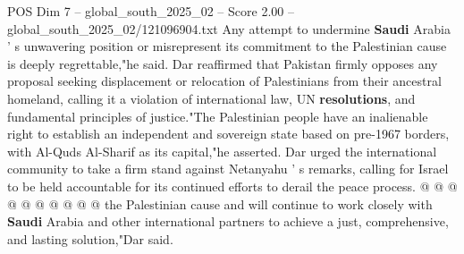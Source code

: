 \begin{textsample}{POS Dim 7 – global\_south\_2025\_02 – Score 2.00 – global\_south\_2025\_02/121096904.txt}
Any attempt to undermine \textbf{Saudi} Arabia ' s unwavering position or misrepresent its commitment to the Palestinian cause is deeply regrettable,"he said.
Dar reaffirmed that Pakistan firmly opposes any proposal seeking displacement or relocation of Palestinians from their ancestral homeland, calling it a violation of international law, UN \textbf{resolutions}, and fundamental principles of justice."The Palestinian people have an inalienable right to establish an independent and sovereign state based on pre-1967 borders, with Al-Quds Al-Sharif as its capital,"he asserted.
Dar urged the international community to take a firm stand against Netanyahu ' s remarks, calling for Israel to be held accountable for its continued efforts to derail the peace process. @ @ @ @ @ @ @ @ @ @ the Palestinian cause and will continue to work closely with \textbf{Saudi} Arabia and other international partners to achieve a just, comprehensive, and lasting solution,"Dar said.

\end{textsample}
